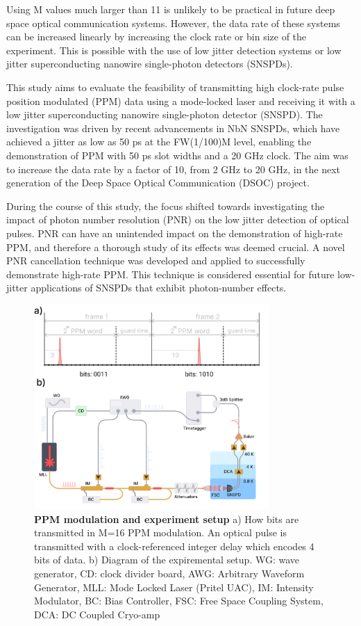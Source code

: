 \documentclass{optica-article}
\begin{document}
Using M values much larger than 11 is unlikely to be practical in future deep space optical communication systems. However, the data rate of these systems can be increased linearly by increasing the clock rate or bin size of the experiment. This is possible with the use of low jitter detection systems or low jitter superconducting nanowire single-photon detectors (SNSPDs).

This study aims to evaluate the feasibility of transmitting high clock-rate pulse position modulated (PPM) data using a mode-locked laser and receiving it with a low jitter superconducting nanowire single-photon detector (SNSPD). The investigation was driven by recent advancements in NbN SNSPDs, which have achieved a jitter as low as 50 ps at the FW(1/100)M level, enabling the demonstration of PPM with 50 ps slot widths and a 20 GHz clock. The aim was to increase the data rate by a factor of 10, from 2 GHz to 20 GHz, in the next generation of the Deep Space Optical Communication (DSOC) project.

During the course of this study, the focus shifted towards investigating the impact of photon number resolution (PNR) on the low jitter detection of optical pulses. PNR can have an unintended impact on the demonstration of high-rate PPM, and therefore a thorough study of its effects was deemed crucial. A novel PNR cancellation technique was developed and applied to successfully demonstrate high-rate PPM. This technique is considered essential for future low-jitter applications of SNSPDs that exhibit photon-number effects.

\hypertarget{fig:intro}{%
\begin{figure}
\centering
\includegraphics[width=0.8\textwidth]{./figs_03/fig_intro_light.pdf}
\caption[{PPM modulation and experiment setup}]{\textbf{PPM modulation and experiment setup} a) How bits are transmitted in M=16 PPM modulation. An optical pulse is transmitted with a clock-referenced integer delay which encodes 4 bits of data. b) Diagram of the expiremental setup. WG: wave generator, CD: clock divider board, AWG: Arbitrary Waveform Generator, MLL: Mode Locked Laser (Pritel UAC), IM: Intensity Modulator, BC: Bias Controller, FSC: Free Space Coupling System, DCA: DC Coupled Cryo-amp}
\label{fig:intro}
\end{figure}
}
\end{document}
